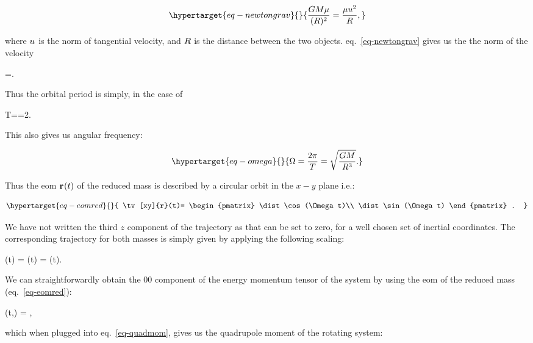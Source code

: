 \documentclass[
  11pt,
  a4paper,
  DIV=11,
  numbers=noendperiod,
  twoside]{scrreprt}
\let\[\relax \let\]\relax %
\DeclareRobustCommand{\[}{\begin{equation}}
\DeclareRobustCommand{\]}{\end{equation}}
\begin{document}
\begin{equation}\protect\hypertarget{eq-newtongrav}{}{
\frac{\grav \totmass\redmass}{\pa{\dist}^2}=\frac{\redmass \vel^2}{\dist},
}\label{eq-newtongrav}\end{equation}

where \(u_{}\) is the norm of tangential velocity, and \(R\) is the
distance between the two objects. eq.~\ref{eq-newtongrav} gives us the
the norm of the velocity

\[
\vel=\sqrt{\frac{\grav \totmass}{\dist}}.
\]

Thus the orbital period is simply, in the case of

\[
T=\frac{2\pi\dist}{\vel}=2\pi{}.
\]

This also gives us angular frequency:

\begin{equation}\protect\hypertarget{eq-omega}{}{  
\Omega=\frac{2\pi}{T}=\sqrt{\frac{\grav\totmass}{\dist^3}}.
}\label{eq-omega}\end{equation}

Thus the \gls{eom} \(\mathbf{{r}}_{}(t)\) of the reduced mass is described by a
circular orbit in the \(x-y\) plane i.e.:

\begin{equation}\protect\hypertarget{eq-eomred}{}{
\tv[xy]{r}(t)= \begin{pmatrix} \dist \cos(\Omega t)\\ \dist \sin(\Omega t) \end{pmatrix} .
}\label{eq-eomred}\end{equation}

We have not written the third \(z\) component of the trajectory as that
can be set to zero, for a well chosen set of inertial coordinates. The
corresponding trajectory for both masses is simply given by applying the
following scaling:

\[
\redmass {}(t)  = \mass[1] (t) = \mass[2] (t).
\]

We can straightforwardly obtain the \(00\) component of the energy
momentum tensor of the system by using
the \gls{eom} of the reduced mass (eq.~\ref{eq-eomred}):

\[
\SEco[00](t,) = \redmass{},
\]

which when plugged into eq.~\ref{eq-quadmom}, gives us the quadrupole
moment of the rotating system:
\end{document}
